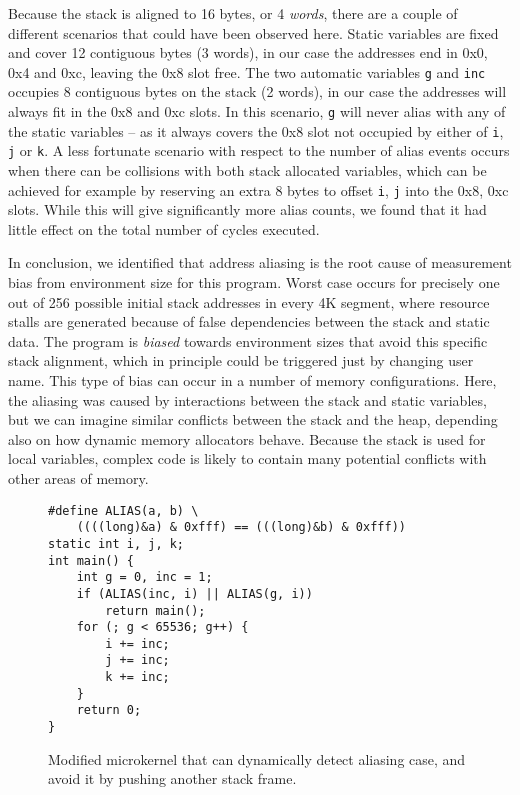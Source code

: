 \documentclass{acm_proc_article-sp}
\begin{document}
Because the stack is aligned to 16 bytes, or 4 \emph{words}, there are a couple of different scenarios that could have been observed here.
Static variables are fixed and cover 12 contiguous bytes (3 words), in our case the addresses end in 0x0, 0x4 and 0xc, leaving the 0x8 slot free.
The two automatic variables \texttt{g} and \texttt{inc} occupies 8 contiguous bytes on the stack (2 words), in our case the addresses will always fit in the 0x8 and 0xc slots.
In this scenario, \texttt{g} will never alias with any of the static variables -- as it always covers the 0x8 slot not occupied by either of \texttt{i}, \texttt{j} or \texttt{k}.
A less fortunate scenario with respect to the number of alias events occurs when there can be collisions with both stack allocated variables, which can be achieved for example by reserving an extra 8 bytes to offset \texttt{i}, \texttt{j} into the 0x8, 0xc slots. 
While this will give significantly more alias counts, we found that it had little effect on the total number of cycles executed.

In conclusion, we identified that address aliasing is the root cause of measurement bias from environment size for this program.
Worst case occurs for precisely one out of 256 possible initial stack addresses in every 4K segment, where resource stalls are generated because of false dependencies between the stack and static data.
The program is \emph{biased} towards environment sizes that avoid this specific stack alignment, which in principle could be triggered just by changing user name.
This type of bias can occur in a number of memory configurations.
Here, the aliasing was caused by interactions between the stack and static variables, but we can imagine similar conflicts between the stack and the heap, depending also on how dynamic memory allocators behave.
Because the stack is used for local variables, complex code is likely to contain many potential conflicts with other areas of memory.

\begin{figure}
  \begin{lstlisting}[frame=single, xleftmargin=.1\textwidth, xrightmargin=.1\textwidth]
#define ALIAS(a, b) \
    ((((long)&a) & 0xfff) == (((long)&b) & 0xfff))
static int i, j, k;
int main() {
    int g = 0, inc = 1;
    if (ALIAS(inc, i) || ALIAS(g, i))
        return main();
    for (; g < 65536; g++) {
        i += inc;
        j += inc;
        k += inc;
    }
    return 0;
}
  \end{lstlisting}
  \caption{Modified microkernel that can dynamically detect aliasing case, and avoid it by pushing another stack frame.}
  \label{lst:loopfixed}
\end{figure}
\end{document}
